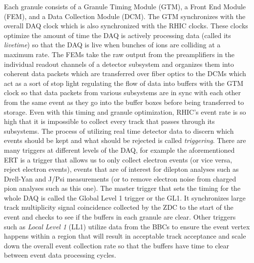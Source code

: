 Each granule consists of a Granule Timing Module (GTM), a Front End Module (FEM), and a Data Collection Module (DCM).  The GTM synchronizes with the overall DAQ clock which is also synchronized with the RHIC clocks. These clocks optimize the amount of time the DAQ is actively processing data (called its \textit{livetime}) so that the DAQ is live when bunches of ions are colliding at a maximum rate. The FEMs take the raw output from the preamplifiers in the individual readout channels of a detector subsystem and organizes them into coherent data packets which are transferred over fiber optics to the DCMs which act as a sort of stop light regulating the flow of data into buffers with the GTM clock so that data packets from various subsystems are in sync with each other from the same event as they go into the buffer boxes before being transferred to storage. Even with this timing and granule optimization, RHIC's event rate is so high that it is impossible to collect every track that passes through its subsystems. The process of utilizing real time detector data to discern which events should be kept and what should be rejected is called \textit{triggering}. There are many triggers at different levels of the DAQ, for example the aforementioned ERT is a trigger that allows us to only collect electron events (or vice versa, reject electron events), events that are of interest for dilepton analyses such as Drell-Yan and J/Psi measurements (or to remove electron noise from charged pion analyses such as this one). The master trigger that sets the timing for the whole DAQ is called the Global Level 1 trigger or the GL1. It synchronizes large track multiplicity signal coincidence collected by the ZDC to the start of the event and checks to see if the buffers in each granule are clear. Other triggers such as \textit{Local Level 1} (LL1) utilize data from the BBCs to ensure the event vertex happens within a region that will result in acceptable track acceptance and scale down the overall event collection rate so that the buffers have time to clear between event data processing cycles.


